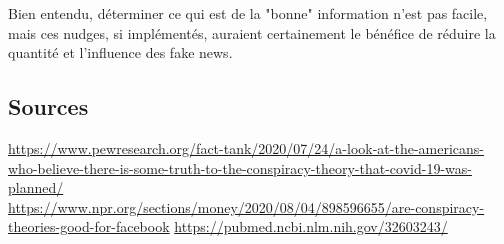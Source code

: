 \documentclass[11pt, a4paper]{article}
\begin{document}
Bien entendu, déterminer ce qui est de la "bonne" information n'est pas facile, mais ces nudges, si implémentés, auraient certainement le bénéfice de réduire la quantité et l'influence des fake news.\\

 \subsection*{Sources}
 \url{https://www.pewresearch.org/fact-tank/2020/07/24/a-look-at-the-americans-who-believe-there-is-some-truth-to-the-conspiracy-theory-that-covid-19-was-planned/} \\
 \url{https://www.npr.org/sections/money/2020/08/04/898596655/are-conspiracy-theories-good-for-facebook}
 \url{https://pubmed.ncbi.nlm.nih.gov/32603243/}

\end{document}

